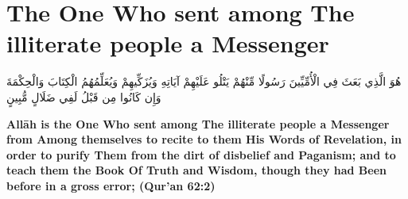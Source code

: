 \chapter{The One Who sent among The illiterate people a Messenger}
\begin{center}
    {\Huge    
        \begin{Arabic}
            هُوَ الَّذِي بَعَثَ فِي الْأُمِّيِّينَ رَسُولًا مِّنْهُمْ يَتْلُو عَلَيْهِمْ آيَاتِهِ وَيُزَكِّيهِمْ وَيُعَلِّمُهُمُ الْكِتَابَ وَالْحِكْمَةَ وَإِن كَانُوا مِن قَبْلُ لَفِي ضَلَالٍ مُّبِينٍ
        \end{Arabic}
    }
\end{center}
\vspace*{\fill}
\vspace{3cm}
\begin{center}
    \large \textbf{Allāh is the One Who sent among The illiterate people a Messenger from Among themselves to recite to them His Words of Revelation, in order to purify Them from the dirt of disbelief and Paganism; and to teach them the Book Of Truth and Wisdom, though they had Been before in a gross error; (Qur'an 62:2)}
\end{center}
